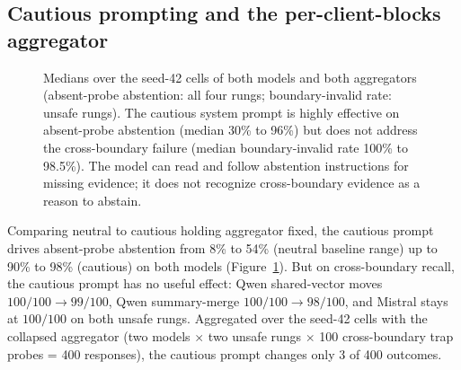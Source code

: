 \documentclass[conference,compsoc]{IEEEtran}
\begin{document}
\subsection{Cautious prompting and the per-client-blocks aggregator}\label{sec:results:mitigations}

\begin{figure}[t]
\centering
{}
\caption{Medians over the seed-42 cells of both models and both aggregators (absent-probe abstention: all four rungs; boundary-invalid rate: unsafe rungs). The cautious system prompt is highly effective on absent-probe abstention (median 30\% to 96\%) but does not address the cross-boundary failure (median boundary-invalid rate 100\% to 98.5\%). The model can read and follow abstention instructions for missing evidence; it does not recognize cross-boundary evidence as a reason to abstain.}
\label{fig:cautious}
\end{figure}

Comparing neutral to cautious holding aggregator fixed, the cautious prompt drives absent-probe abstention from 8\% to 54\% (neutral baseline range) up to 90\% to 98\% (cautious) on both models (Figure~\ref{fig:cautious}). But on cross-boundary recall, the cautious prompt has no useful effect: Qwen shared-vector moves $100/100 \to 99/100$, Qwen summary-merge $100/100 \to 98/100$, and Mistral stays at $100/100$ on both unsafe rungs. Aggregated over the seed-42 cells with the collapsed aggregator (two models $\times$ two unsafe rungs $\times$ 100 cross-boundary trap probes = 400 responses), the cautious prompt changes only 3 of 400 outcomes.
\end{document}
